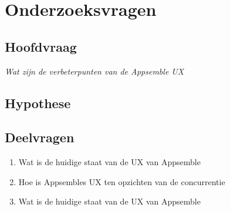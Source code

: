\chapter{Onderzoeksvragen}
\section{Hoofdvraag}
\emph{Wat zijn de verbeterpunten van de Appsemble UX}
\section{Hypothese}
\section{Deelvragen}
\begin{enumerate}
	\item Wat is de huidige staat van de UX van Appsemble\\
	\item Hoe is Appsembles UX ten opzichten van de concurrentie\\
	\item Wat is de huidige staat van de UX van Appsemble\\
\end{enumerate}